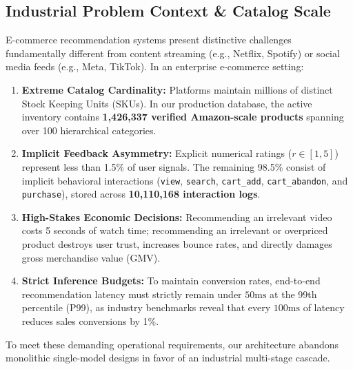 \documentclass[11pt,a4paper]{article}
\begin{document}
\subsection{Industrial Problem Context \& Catalog Scale}
E-commerce recommendation systems present distinctive challenges fundamentally different from content streaming (e.g., Netflix, Spotify) or social media feeds (e.g., Meta, TikTok). In an enterprise e-commerce setting:
\begin{enumerate}[leftmargin=*]
    \item \textbf{Extreme Catalog Cardinality:} Platforms maintain millions of distinct Stock Keeping Units (SKUs). In our production database, the active inventory contains \textbf{1,426,337 verified Amazon-scale products} spanning over 100 hierarchical categories.
    \item \textbf{Implicit Feedback Asymmetry:} Explicit numerical ratings ($r \in [1, 5]$) represent less than 1.5\% of user signals. The remaining 98.5\% consist of implicit behavioral interactions (\texttt{view}, \texttt{search}, \texttt{cart\_add}, \texttt{cart\_abandon}, and \texttt{purchase}), stored across \textbf{10,110,168 interaction logs}.
    \item \textbf{High-Stakes Economic Decisions:} Recommending an irrelevant video costs 5 seconds of watch time; recommending an irrelevant or overpriced product destroys user trust, increases bounce rates, and directly damages gross merchandise value (GMV).
    \item \textbf{Strict Inference Budgets:} To maintain conversion rates, end-to-end recommendation latency must strictly remain under $50\text{ms}$ at the 99th percentile (P99), as industry benchmarks reveal that every $100\text{ms}$ of latency reduces sales conversions by 1\%.
\end{enumerate}

To meet these demanding operational requirements, our architecture abandons monolithic single-model designs in favor of an industrial multi-stage cascade.
\end{document}
